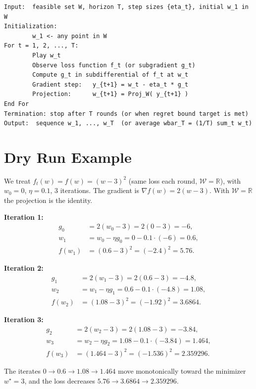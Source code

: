 \documentclass[11pt]{article}
\begin{document}
\begin{verbatim}
Input:  feasible set W, horizon T, step sizes {eta_t}, initial w_1 in W
Initialization:
        w_1 <- any point in W
For t = 1, 2, ..., T:
        Play w_t
        Observe loss function f_t (or subgradient g_t)
        Compute g_t in subdifferential of f_t at w_t
        Gradient step:   y_{t+1} = w_t - eta_t * g_t
        Projection:      w_{t+1} = Proj_W( y_{t+1} )
End For
Termination: stop after T rounds (or when regret bound target is met)
Output:  sequence w_1, ..., w_T  (or average wbar_T = (1/T) sum_t w_t)
\end{verbatim}

\section*{Dry Run Example}

We treat $f_t(w) = f(w) = (w-3)^2$ (same loss each round, $\mathcal{W}=\mathbb{R}$),
with $w_0 = 0$, $\eta = 0.1$, $3$ iterations. The gradient is
$\nabla f(w) = 2(w-3)$. With $\mathcal{W}=\mathbb{R}$ the projection is the identity.

\textbf{Iteration 1:}
\begin{align*}
g_0 &= 2(w_0 - 3) = 2(0-3) = -6,\\
w_1 &= w_0 - \eta g_0 = 0 - 0.1\cdot(-6) = 0.6,\\
f(w_1) &= (0.6-3)^2 = (-2.4)^2 = 5.76.
\end{align*}

\textbf{Iteration 2:}
\begin{align*}
g_1 &= 2(w_1 - 3) = 2(0.6-3) = -4.8,\\
w_2 &= w_1 - \eta g_1 = 0.6 - 0.1\cdot(-4.8) = 1.08,\\
f(w_2) &= (1.08-3)^2 = (-1.92)^2 = 3.6864.
\end{align*}

\textbf{Iteration 3:}
\begin{align*}
g_2 &= 2(w_2 - 3) = 2(1.08-3) = -3.84,\\
w_3 &= w_2 - \eta g_2 = 1.08 - 0.1\cdot(-3.84) = 1.464,\\
f(w_3) &= (1.464-3)^2 = (-1.536)^2 = 2.359296.
\end{align*}

The iterates $0 \to 0.6 \to 1.08 \to 1.464$ move monotonically toward the minimizer
$w^\star = 3$, and the loss decreases $5.76 \to 3.6864 \to 2.359296$.

\end{document}
